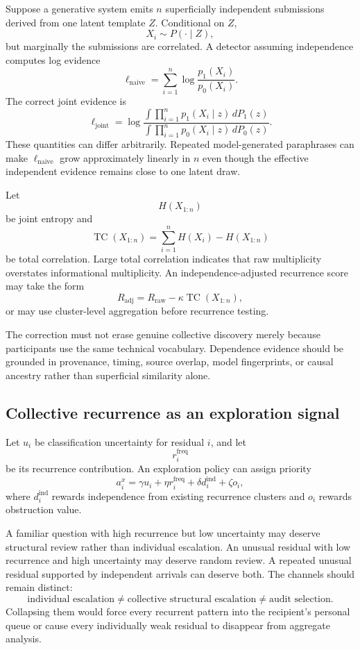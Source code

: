\documentclass[11pt]{article}
\theoremstyle{definition}
\begin{document}
Suppose a generative system emits \(n\) superficially independent submissions derived from one latent template \(Z\). Conditional on \(Z\),
\[
X_i\sim P(\cdot\mid Z),
\]
but marginally the submissions are correlated. A detector assuming independence computes log evidence
\[
\ell_{\mathrm{naive}}
=
\sum_{i=1}^{n}
\log
\frac{p_1(X_i)}{p_0(X_i)}.
\]
The correct joint evidence is
\[
\ell_{\mathrm{joint}}
=
\log
\frac{
\int
\prod_{i=1}^{n}p_1(X_i\mid z)\,dP_1(z)
}{
\int
\prod_{i=1}^{n}p_0(X_i\mid z)\,dP_0(z)
}.
\]
These quantities can differ arbitrarily. Repeated model-generated paraphrases can make \(\ell_{\mathrm{naive}}\) grow approximately linearly in \(n\) even though the effective independent evidence remains close to one latent draw.

Let
\[
H(X_{1:n})
\]
be joint entropy and
\[
\operatorname{TC}(X_{1:n})
=
\sum_{i=1}^{n}H(X_i)-H(X_{1:n})
\]
be total correlation. Large total correlation indicates that raw multiplicity overstates informational multiplicity. An independence-adjusted recurrence score may take the form
\[
R_{\mathrm{adj}}
=
R_{\mathrm{raw}}
-
\kappa\operatorname{TC}(X_{1:n}),
\]
or may use cluster-level aggregation before recurrence testing.

The correction must not erase genuine collective discovery merely because participants use the same technical vocabulary. Dependence evidence should be grounded in provenance, timing, source overlap, model fingerprints, or causal ancestry rather than superficial similarity alone.

\subsection{Collective recurrence as an exploration signal}

Let \(u_i\) be classification uncertainty for residual \(i\), and let
\[
r_i^{\mathrm{freq}}
\]
be its recurrence contribution. An exploration policy can assign priority
\[
a_i^{x}
=
\gamma u_i
+
\eta r_i^{\mathrm{freq}}
+
\delta d_i^{\mathrm{ind}}
+
\zeta o_i,
\]
where \(d_i^{\mathrm{ind}}\) rewards independence from existing recurrence clusters and \(o_i\) rewards obstruction value.

A familiar question with high recurrence but low uncertainty may deserve structural review rather than individual escalation. An unusual residual with low recurrence and high uncertainty may deserve random review. A repeated unusual residual supported by independent arrivals can deserve both. The channels should remain distinct:
\[
\text{individual escalation}
\neq
\text{collective structural escalation}
\neq
\text{audit selection}.
\]
Collapsing them would force every recurrent pattern into the recipient's personal queue or cause every individually weak residual to disappear from aggregate analysis.
\end{document}
